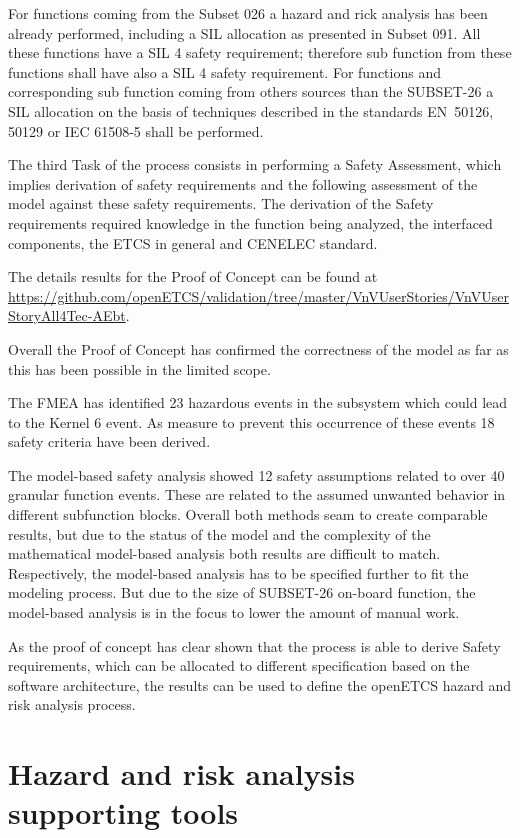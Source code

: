 \documentclass{template/openetcs_report}
\begin{document}
For functions coming from the Subset 026 a hazard and rick analysis has been already performed, including a SIL allocation as presented in Subset 091. All these functions have a SIL 4 safety requirement; therefore sub function from these functions shall have also a SIL 4 safety requirement. For functions and corresponding sub function coming from others sources than the SUBSET-26 a SIL allocation on the basis of techniques described in the standards EN~50126, 50129 or IEC 61508-5 shall be performed.
 
The third Task of the process consists in performing a Safety Assessment, which implies derivation of safety requirements and the following assessment of the model against these safety requirements. The derivation of the Safety requirements required knowledge in the function being analyzed, the interfaced components, the ETCS in general and CENELEC standard.
 
 
The details results for the Proof of Concept can be found at \url{https://github.com/openETCS/validation/tree/master/VnVUserStories/VnVUserStoryAll4Tec-AEbt}. 

Overall the Proof of Concept has confirmed the correctness of the model as far as this has been possible in the limited scope. 

The FMEA has identified 23 hazardous events in the subsystem which could lead to the Kernel 6 event. As measure to prevent this occurrence of these events 18 safety criteria have been derived.  

The model-based safety analysis showed 12 safety assumptions related to over 40 granular function events. These are related to the assumed unwanted behavior in different subfunction blocks. Overall both methods seam to create comparable results, but due to the status of the model and the complexity of the mathematical model-based analysis both results are difficult to match. Respectively, the model-based analysis has to be specified further to fit the modeling process. But due to the size of SUBSET-26 on-board function, the model-based analysis is in the focus to lower the amount of manual work.
 
As the proof of concept has clear shown that the process is able to derive Safety requirements, which can be allocated to different specification based on the software architecture, the results can be used to define the openETCS hazard and risk analysis process.
 
\section{Hazard and risk analysis supporting tools}
\end{document}

